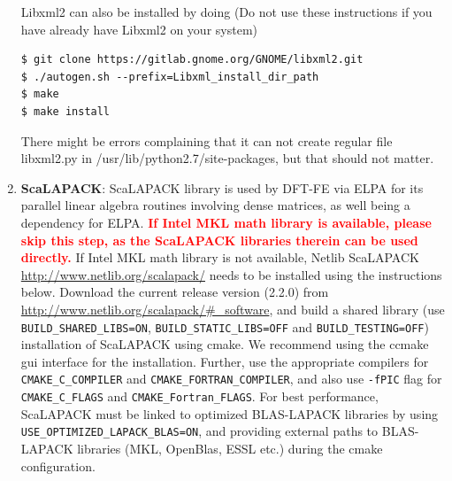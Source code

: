 \begin{enumerate}
Libxml2 can also be installed by doing (Do not use these instructions if you have already have Libxml2 on your system)
\begin{verbatim}
$ git clone https://gitlab.gnome.org/GNOME/libxml2.git
$ ./autogen.sh --prefix=Libxml_install_dir_path
$ make
$ make install 
\end{verbatim}
There might be errors complaining that it can not create regular file libxml2.py in /usr/lib/python2.7/site-packages, but that should not matter.

\item {\bf ScaLAPACK}: ScaLAPACK library is used by DFT-FE via ELPA for its parallel linear algebra routines involving dense matrices, as well being a dependency for ELPA. \textcolor{red}{\bf If Intel MKL math library is available, please skip this step, as the ScaLAPACK libraries therein can be used directly.} If Intel MKL math library is not available, Netlib ScaLAPACK \url{http://www.netlib.org/scalapack/} needs to be installed using the instructions below. Download the current release version (2.2.0) from \url{http://www.netlib.org/scalapack/#\_software}, and build a shared library (use \verb|BUILD_SHARED_LIBS=ON|, \verb|BUILD_STATIC_LIBS=OFF| and \verb|BUILD_TESTING=OFF|) installation of ScaLAPACK using cmake. We recommend using the ccmake gui interface for the installation.  Further, use the appropriate compilers for \verb|CMAKE_C_COMPILER| and \verb|CMAKE_FORTRAN_COMPILER|, and also use \verb|-fPIC| flag for \verb|CMAKE_C_FLAGS| and \verb|CMAKE_Fortran_FLAGS|. For best performance, ScaLAPACK must be linked to optimized BLAS-LAPACK libraries by using\\ \verb|USE_OPTIMIZED_LAPACK_BLAS=ON|, and providing external paths to BLAS-LAPACK libraries (MKL, OpenBlas, ESSL etc.) during the cmake configuration. 


\end{enumerate}
